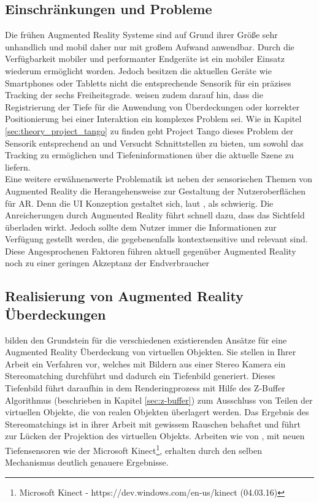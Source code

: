 \subsection{Einschränkungen und Probleme}

Die frühen Augmented Reality Systeme sind auf Grund ihrer Größe sehr unhandlich und mobil daher nur mit großem Aufwand anwendbar. Durch die Verfügbarkeit mobiler und performanter Endgeräte ist ein mobiler Einsatz wiederum ermöglicht worden. Jedoch besitzen die aktuellen Geräte wie Smartphones oder Tabletts nicht die entsprechende Sensorik für ein präzises Tracking der sechs Freiheitsgrade. \citet{van2010survey} weisen zudem darauf hin, dass die Registrierung der Tiefe für die Anwendung von Überdeckungen oder korrekter Positionierung bei einer Interaktion ein komplexes Problem sei. Wie in Kapitel \ref{sec:theory_project_tango} zu finden geht Project Tango dieses Problem der Sensorik entsprechend an und Versucht Schnittstellen zu bieten, um sowohl das Tracking zu ermöglichen und Tiefeninformationen über die aktuelle Szene zu liefern. \\

Eine weitere erwähnenswerte Problematik ist neben der sensorischen Themen von Augmented Reality die Herangehensweise zur Gestaltung der Nutzeroberflächen für AR. Denn die UI Konzeption gestaltet sich, laut \citet{azuma2001recent}, als schwierig. Die Anreicherungen durch Augmented Reality führt schnell dazu, dass das Sichtfeld überladen wirkt. Jedoch sollte dem Nutzer immer die Informationen zur Verfügung gestellt werden, die gegebenenfalls kontextsensitive und relevant sind. Diese Angesprochenen Faktoren führen aktuell gegenüber Augmented Reality noch zu einer geringen Akzeptanz der Endverbraucher\\

\subsection{Realisierung von Augmented Reality Überdeckungen}

\citet{wloka1995resolving} bilden den Grundstein für die verschiedenen existierenden Ansätze für eine Augmented Reality Überdeckung von virtuellen Objekten. Sie stellen in Ihrer Arbeit ein Verfahren vor, welches mit Bildern aus einer Stereo Kamera ein Stereomatching durchführt und dadurch ein Tiefenbild generiert. Dieses Tiefenbild führt daraufhin in dem Renderingprozess mit Hilfe des Z-Buffer Algorithmus (beschrieben in Kapitel \ref{sec:z-buffer}) zum Ausschluss von Teilen der virtuellen Objekte, die von realen Objekten überlagert werden. Das Ergebnis des Stereomatchings ist in ihrer Arbeit mit gewissem Rauschen behaftet und führt zur Lücken der Projektion des virtuellen Objekts. Arbeiten wie von \citet{seo2013direct}, mit neuen Tiefensensoren wie der Microsoft Kinect\footnote{Microsoft Kinect - https://dev.windows.com/en-us/kinect (04.03.16)}, erhalten durch den selben Mechanismus deutlich genauere Ergebnisse. \\

